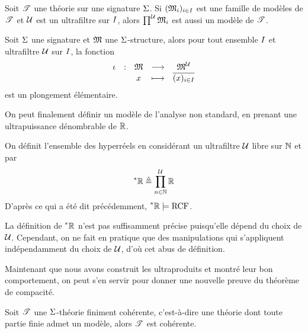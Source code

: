 \begin{corollary}
  Soit $\mathscr T$ une théorie sur une signature $\Sigma$. Si
  $(\mathfrak{M}_i)_{i \in I}$ est une famille de modèles de $\mathscr T$ et $\mathcal{U}$
  est un ultrafiltre sur $I$, alors $\prod^{\mathcal{U}}\mathfrak{M}_i$ est aussi un
  modèle de $\mathscr T$.
\end{corollary}

\begin{corollary}
  Soit $\Sigma$ une signature et $\mathfrak{M}$ une $\Sigma$-structure, alors pour
  tout ensemble $I$ et ultrafiltre $\mathcal{U}$ sur $I$, la fonction
  \[\makeFun{\iota}{\varMM}{\varMM^{\varUlF}}
            {x}{\clas{(x)_{i \in \indSet}}}\]
  est un plongement élémentaire.
\end{corollary}

On peut finalement définir un modèle de l'analyse non standard, en prenant une
ultrapuissance dénombrable de $\mathbb R$.

\begin{definition}[Hyperréels]
  On définit l'ensemble des hyperréels en considérant un ultrafiltre
  $\mathcal{U}$ libre sur $\mathbb N$ et par
  \[\prescript{*}{}{\mathbb R} \triangleq \prod_{n \in \mathbb N}^{\mathcal{U}} \mathbb R\]
  D'après ce qui a été dit précédemment, $\prescript{*}{}{\mathbb R}\models \operatorname{RCF}$.
  \index[notation]{$\bRR$}
\end{definition}

\begin{remark}
  La définition de $\bRR$ n'est pas suffisamment précise puisqu'elle dépend du
  choix de $\mathcal{U}$. Cependant, on ne fait en pratique que des manipulations
  qui s'appliquent indépendamment du choix de $\mathcal{U}$, d'où cet abus de
  définition.
\end{remark}

Maintenant que nous avons construit les ultraproduits et montré leur bon
comportement, on peut s'en servir pour donner une nouvelle preuve du théorème
de compacité.

\begin{theorem}[Compacité]
  Soit $\mathscr T$ une $\Sigma$-théorie finiment cohérente, c'est-à-dire une théorie
  dont toute partie finie admet un modèle, alors $\mathscr T$ est cohérente.
\end{theorem}

